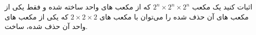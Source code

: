 \begin{PROBLEM}
	\p
	اثبات کنید یک مکعب 
	$2^n \times 2^n \times 2^n$
	که از مکعب های واحد ساخته شده و فقط یکی از مکعب های آن حذف شده را می‌توان
	با مکعب های
	$2 \times 2 \times 2$
	که یکی از مکعب های واحد آن حذف شده، ساخت. 
	\SOLUTION{
		\p
		
	}
\end{PROBLEM}